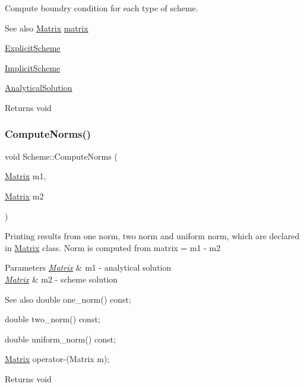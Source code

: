 Compute boundry condition for each type of scheme. \begin{DoxySeeAlso}{See also}
\mbox{\hyperlink{class_matrix}{Matrix}} \mbox{\hyperlink{class_scheme_a0e1fb8cb7e062d3f49715445a884f0e8}{matrix}} 

\mbox{\hyperlink{class_explicit_scheme}{Explicit\+Scheme}} 

\mbox{\hyperlink{class_implicit_scheme}{Implicit\+Scheme}} 

\mbox{\hyperlink{class_scheme_a7d3e9f8133a955517471eb7a6fea355f}{Analytical\+Solution}} 
\end{DoxySeeAlso}
\begin{DoxyReturn}{Returns}
void 
\end{DoxyReturn}
\mbox{\label{class_scheme_ae098876d0287ac2bf5220608db2a8468}} 
\subsubsection{\texorpdfstring{Compute\+Norms()}{ComputeNorms()}}
{\footnotesize\ttfamily void Scheme\+::\+Compute\+Norms (\begin{DoxyParamCaption}\item[{\mbox{\hyperlink{class_matrix}{Matrix}}}]{m1,  }\item[{\mbox{\hyperlink{class_matrix}{Matrix}}}]{m2 }\end{DoxyParamCaption})}

Printing results from one norm, two norm and uniform norm, which are declared in \mbox{\hyperlink{class_matrix}{Matrix}} class. Norm is computed from matrix = m1 -\/ m2 
\begin{DoxyParams}{Parameters}
{\em \mbox{\hyperlink{class_matrix}{Matrix}}} & m1 -\/ analytical solution \\
\hline
{\em \mbox{\hyperlink{class_matrix}{Matrix}}} & m2 -\/ scheme solution \\
\hline
\end{DoxyParams}
\begin{DoxySeeAlso}{See also}
double one\+\_\+norm() const; 

double two\+\_\+norm() const; 

double uniform\+\_\+norm() const; 

\mbox{\hyperlink{class_matrix}{Matrix}} operator-\/(\+Matrix m); 
\end{DoxySeeAlso}
\begin{DoxyReturn}{Returns}
void 
\end{DoxyReturn}
\mbox{\label{class_scheme_a0364e328d78e84be15d293a66d946008}} 
